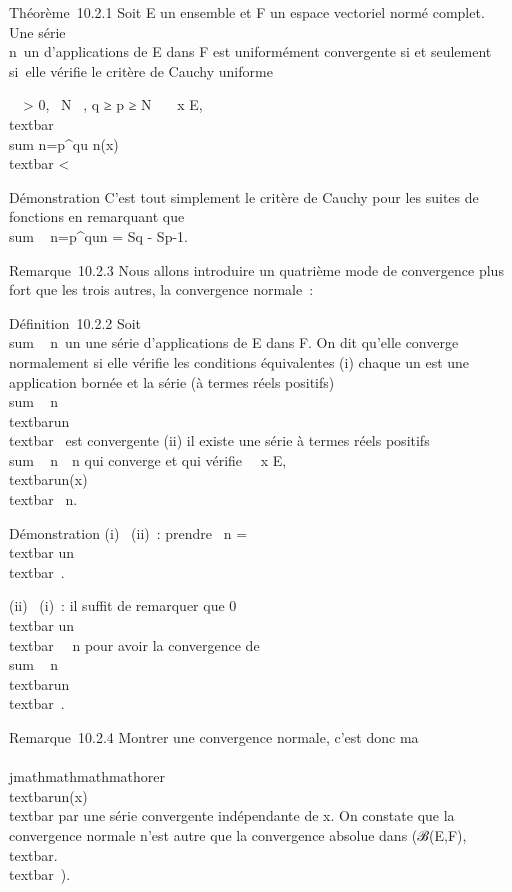 Théorème~10.2.1 Soit E un ensemble et F un espace vectoriel normé
complet. Une série \\\sum
 n\in{}~un d'applications de E dans F est uniformément
convergente si et seulement si~elle vérifie le critère de Cauchy
uniforme

\forall~~\epsilon \textgreater{} 0,
\exists~N \in {}~, q ≥ p ≥ N
\rigtharrow~\forall~~x \in E,
\\textbar{}\\sum
n=p^qu n(x)\\textbar{}
\textless{} \epsilon

Démonstration C'est tout simplement le critère de Cauchy pour les suites
de fonctions en remarquant que
\\sum ~
n=p^qun = Sq - Sp-1.

Remarque~10.2.3 Nous allons introduire un quatrième mode de convergence
plus fort que les trois autres, la convergence normale~:

Définition~10.2.2 Soit
\\sum ~
n\in{}~un une série d'applications de E dans F. On dit
qu'elle converge normalement si elle vérifie les conditions équivalentes
(i) chaque un est une application bornée et la série (à termes
réels positifs) \\sum ~
n\in{}~\\textbar{}un\\textbar{}\infty~
est convergente (ii) il existe une série à termes réels positifs
\\sum ~
n\in{}~\alpha~n qui converge et qui vérifie
\forall~~x \in E,
\\textbar{}un(x)\\textbar{} \leq
\alpha~n.

Démonstration (i) \rigtharrow~(ii)~: prendre \alpha~n
=\\textbar{} un\\textbar{}\infty~.

(ii) \rigtharrow~(i)~: il suffit de remarquer que 0 \leq\\textbar{}
un\\textbar{}\infty~ \leq \alpha~n pour avoir la
convergence de \\sum ~
n\in{}~\\textbar{}un\\textbar{}\infty~.

Remarque~10.2.4 Montrer une convergence normale, c'est donc ma\\\\jmathmathmathmathorer
\\textbar{}un(x)\\textbar{} par
une série convergente indépendante de x. On constate que la convergence
normale n'est autre que la convergence absolue dans
(ℬ(E,F),\\textbar{}.\\textbar{}\infty~).

